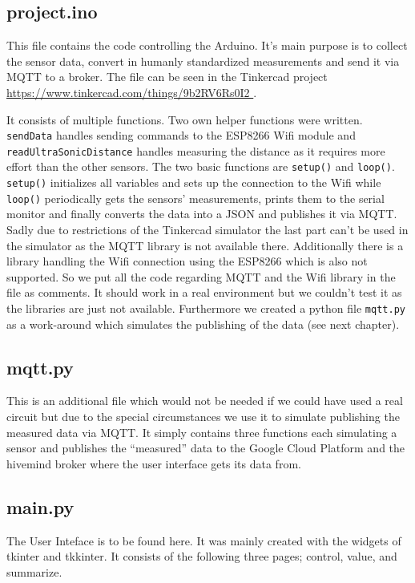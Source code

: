 \documentclass{article}
\begin{document}
\subsection{project.ino}
This file contains the code controlling the Arduino. It's main purpose is to collect the sensor data, convert in humanly standardized measurements and send it via MQTT to a broker. The file can be seen in the Tinkercad project \url{ https://www.tinkercad.com/things/9b2RV6Rs0I2 }.\par 
It consists of multiple functions. Two own helper functions were written. \texttt{sendData} handles sending commands to the ESP8266 Wifi module and \texttt{readUltraSonicDistance} handles measuring the distance as it requires more effort than the other sensors. The two basic functions are \texttt{setup()} and \texttt{loop()}. \texttt{setup()} initializes all variables and sets up the connection to the Wifi while \texttt{loop()} periodically gets the sensors' measurements, prints them to the serial monitor and finally converts the data into a JSON and publishes it via MQTT. Sadly due to restrictions of the Tinkercad simulator the last part can't be used in the simulator as the MQTT library is not available there. Additionally there is a library handling the Wifi connection using the ESP8266 which is also not supported. So we put all the code regarding MQTT and the Wifi library in the file as comments. It should work in a real environment but we couldn't test it as the libraries are just not available. Furthermore we created a python file \texttt{mqtt.py} as a work-around which simulates the publishing of the data (see next chapter).\par
\subsection{mqtt.py}
This is an additional file which would not be needed if we could have used a real circuit but due to the special circumstances we use it to simulate publishing the measured data via MQTT. It simply contains three functions each simulating a sensor and publishes the \enquote{measured} data to the Google Cloud Platform and the hivemind broker where the user interface gets its data from.
\subsection{main.py}
The User Inteface is to be found here. It was mainly created with the widgets of tkinter and tkkinter. It consists of the following three pages; control, value, and summarize.
\end{document}

